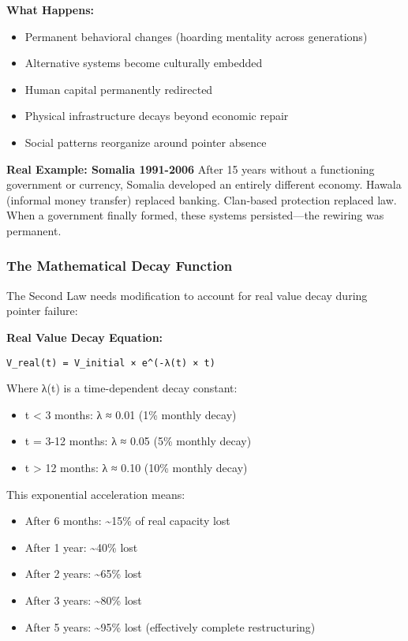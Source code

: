 \documentclass[11pt,oneside]{book}
\begin{document}
\textbf{What Happens:}
\begin{itemize}
\item Permanent behavioral changes (hoarding mentality across generations)
\item Alternative systems become culturally embedded
\item Human capital permanently redirected
\item Physical infrastructure decays beyond economic repair
\item Social patterns reorganize around pointer absence
\end{itemize}

\textbf{Real Example: Somalia 1991-2006}
After 15 years without a functioning government or currency, Somalia developed an entirely different economy. Hawala (informal money transfer) replaced banking. Clan-based protection replaced law. When a government finally formed, these systems persisted—the rewiring was permanent.

\subsubsection{The Mathematical Decay Function}

The Second Law needs modification to account for real value decay during pointer failure:

\textbf{Real Value Decay Equation:}
\begin{verbatim}
V_real(t) = V_initial × e^(-λ(t) × t)
\end{verbatim}

Where λ(t) is a time-dependent decay constant:
\begin{itemize}
\item t < 3 months: λ ≈ 0.01 (1\% monthly decay)
\item t = 3-12 months: λ ≈ 0.05 (5\% monthly decay)
\item t > 12 months: λ ≈ 0.10 (10\% monthly decay)
\end{itemize}

This exponential acceleration means:
\begin{itemize}
\item After 6 months: \textasciitilde{}15\% of real capacity lost
\item After 1 year: \textasciitilde{}40\% lost
\item After 2 years: \textasciitilde{}65\% lost
\item After 3 years: \textasciitilde{}80\% lost
\item After 5 years: \textasciitilde{}95\% lost (effectively complete restructuring)
\end{itemize}
\end{document}
